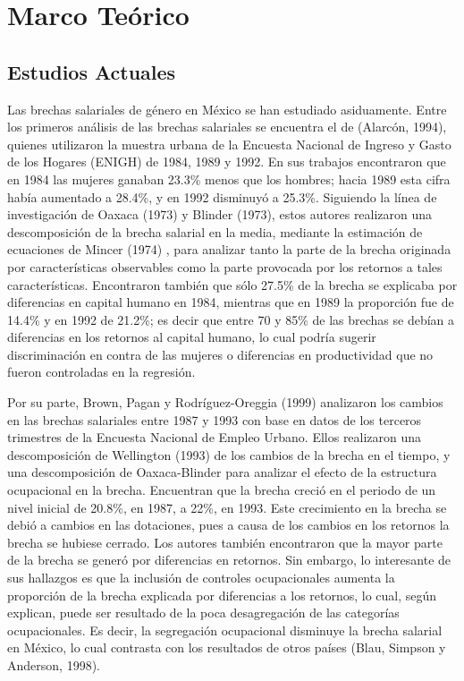 \newpage
\section{Marco Te\'orico}

\subsection{Estudios Actuales}
Las brechas salariales de g\'enero en M\'exico se han estudiado asiduamente. Entre los primeros an\'alisis de las brechas salariales se encuentra el de (Alarc\'on, 1994), quienes utilizaron la muestra urbana de la Encuesta Nacional de Ingreso y Gasto de los Hogares (ENIGH) de 1984, 1989 y 1992. En sus trabajos encontraron que en 1984 las mujeres ganaban 23.3\% menos que los hombres; hacia 1989 esta cifra hab\'ia aumentado a 28.4\%, y en 1992 disminuy\'o a 25.3\%. Siguiendo la l\'inea de investigaci\'on de Oaxaca (1973) y Blinder (1973), estos autores realizaron una descomposici\'on de la brecha salarial en la media, mediante la estimaci\'on de ecuaciones de Mincer (1974) , para analizar tanto la parte de la brecha originada por caracter\'isticas observables como la parte provocada por los retornos a tales caracter\'isticas. Encontraron tambi\'en que s\'olo 27.5\% de la brecha se explicaba por diferencias en capital humano en 1984, mientras que en 1989 la proporci\'on fue de 14.4\% y en 1992 de 21.2\%; es decir que entre 70 y 85\% de las brechas se deb\'ian a diferencias en los retornos al capital humano, lo cual podr\'ia sugerir discriminaci\'on en contra de las mujeres o diferencias en productividad que no fueron controladas en la regresi\'on.

Por su parte, Brown, Pagan y Rodr\'iguez-Oreggia (1999) analizaron los cambios en las brechas salariales entre 1987 y 1993 con base en datos de los terceros trimestres de la Encuesta Nacional de Empleo Urbano. Ellos realizaron una descomposici\'on de Wellington (1993) de los cambios de la brecha en el tiempo, y una descomposici\'on de Oaxaca-Blinder para analizar el efecto de la estructura ocupacional en la brecha. Encuentran que la brecha creci\'o en el periodo de un nivel inicial de 20.8\%, en 1987, a 22\%, en 1993. Este crecimiento en la brecha se debi\'o a cambios en las dotaciones, pues a causa de los cambios en los retornos la brecha se hubiese cerrado. Los autores tambi\'en encontraron que la mayor parte de la brecha se gener\'o por diferencias en retornos. Sin embargo, lo interesante de sus hallazgos es que la inclusi\'on de controles ocupacionales aumenta la proporci\'on de la brecha explicada por diferencias a los retornos, lo cual, seg\'un explican, puede ser resultado de la poca desagregaci\'on de las categor\'ias ocupacionales. Es decir, la segregaci\'on ocupacional disminuye la brecha salarial en M\'exico, lo cual contrasta con los resultados de otros pa\'ises (Blau, Simpson y Anderson, 1998).

